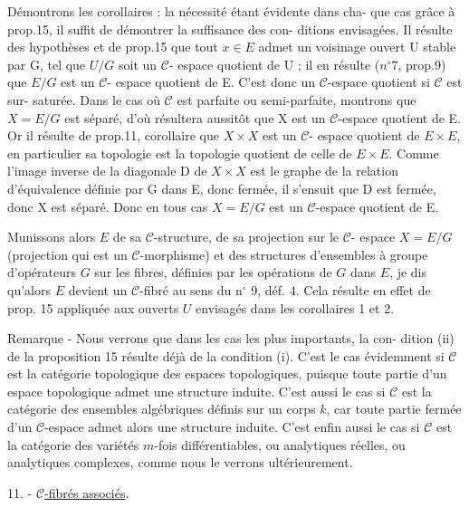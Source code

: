 Démontrons les corollaires : la nécessité étant évidente dans cha-
que cas grâce à prop.15, il suffit de démontrer la suffisance des con-
ditions envisagées. Il résulte des hypothèses et de prop.15 que tout
$x \in E$ admet un voisinage ouvert U stable par G, tel que $U/G$ soit un $\mathcal{C}$-
espace quotient de U ; il en résulte ($n^{\circ} 7$, prop.9) que $E/G$ est un $\mathcal{C}$-
espace quotient de E. C'est donc un $\mathcal{C}$-espace quotient si $\mathcal{C}$ est sur-
saturée. Dans le cas où $\mathcal{C}$ est parfaite ou semi-parfaite, montrons que
$X = E/G$ est séparé, d'où résultera aussitôt que X est un $\mathcal{C}$-espace
quotient de E. Or il résulte de prop.11, corollaire que $X \times X$ est un $\mathcal{C}$-
espace quotient de $E \times E$, en particulier sa topologie est la topologie
quotient de celle de $E \times E$. Comme l'image inverse de la diagonale D de
$X \times X$ est le graphe de la relation d'équivalence définie par G dans E,
donc fermée, il s'ensuit que D est fermée, donc X est séparé. Donc en
tous cas $X = E/G$ est un $\mathcal{C}$-espace quotient de E.

\newpage



Munissons alors $E$ de sa $\mathcal{C}$-structure, de sa projection sur le $\mathcal{C}$-
espace $X = E/G$ (projection qui est un $\mathcal{C}$-morphisme) et des structures
d'ensembles à groupe d'opérateurs $G$ sur les fibres, définies par les
opérations de $G$ dans $E$, je dis qu'alors $E$ devient un $\mathcal{C}$-fibré au sens
du n$^\circ$ 9, déf. 4. Cela résulte en effet de prop. 15 appliquée aux ouverts
$U$ envisagés dans les corollaires 1 et 2.

Remarque - Nous verrons que dans les cas les plus importants, la con-
dition (ii) de la proposition 15 résulte déjà de la condition (i).
C'est le cas évidemment si $\mathcal{C}$ est la catégorie topologique des espaces
topologiques, puisque toute partie d'un espace topologique admet une
structure induite. C'est aussi le cas si $\mathcal{C}$ est la catégorie des
ensembles algébriques définis sur un corps $k$, car toute partie fermée
d'un $\mathcal{C}$-espace admet alors une structure induite. C'est enfin aussi
le cas si $\mathcal{C}$ est la catégorie des variétés $m$-fois différentiables, ou
analytiques réelles, ou analytiques complexes, comme nous le verrons
ultérieurement.

11. - \underline{$\mathcal{C}$-fibrés associés}.

